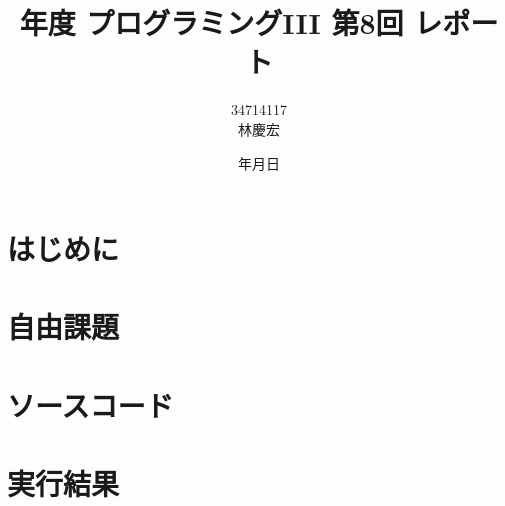 \documentclass[a4j,11pt]{jarticle}
\title{{\thisyear}年度 プログラミングIII 第8回 レポート}
\date{\the\year 年\the\month 月\the\day 日}
\author{34714117 \\ 林慶宏}
\begin{document}
\maketitle
\clearpage

\section{はじめに}
\section{自由課題}

\section{ソースコード}

\section{実行結果}
\begin{verbatim}

\end{verbatim}
\end{document}
